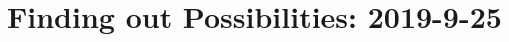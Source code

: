 \documentclass[../../main.tex]{subfiles}
\begin{document}
\section{\textbf{Finding out Possibilities}: 2019-9-25}
\end{document}
